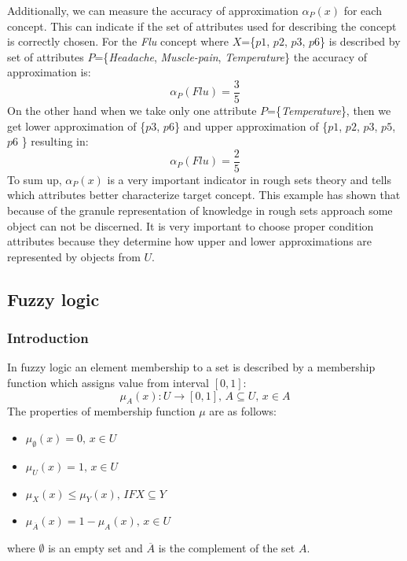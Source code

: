Additionally, we can measure the accuracy of approximation $\alpha_P(x)$ for each concept.
This can indicate if the set of attributes used for describing the concept is correctly
chosen. For the \textit{Flu} concept where $X$=\{$p1$, $p2$, $p3$, $p6$\} is described by
set of attributes $P$=\{\textit{Headache}, \textit{Muscle-pain},
\textit{Temperature}\} the accuracy of approximation is:
$$\alpha_P(Flu) = \frac{3}{5}$$
On the other hand when we take only one attribute $P$=\{\textit{Temperature}\}, then we get lower approximation of 
\{$p3$, $p6$\} and upper approximation of \{$p1$, $p2$, $p3$, $p5$, $p6$ \}
resulting in:
$$\alpha_P(Flu) = \frac{2}{5}$$
To sum up, $\alpha_P(x)$ is a very important indicator in
rough sets theory and tells which attributes better characterize target
concept. This example has shown that because of the granule representation of
knowledge in rough sets approach some object can not be discerned. It is very
important to choose proper condition attributes because they determine how
upper and lower approximations are represented by objects from $U$. 


\subsection{Fuzzy logic}
\label{cha:Fuzzy_logic}
\subsubsection{Introduction}
In fuzzy logic an element membership to a set is described by a membership function 
which assigns value from interval $[0, 1]$:
\begin{equation}
    \mu_A(x):U\rightarrow [0,1], \, A \subseteq U, \, x \in A
    \label{eq:fuzzy_function}
\end{equation}
The properties of membership function $\mu$ are as follows:
\begin{itemize}
    \item $\mu_{\emptyset}(x) = 0, \, x \in U$
    \item  $\mu_{U}(x) = 1, \, x \in U$
    \item  $\mu_{X}(x) \leq \mu_{Y}(x), \, IF X \subseteq Y$
    \item  $\mu_{\overline{A}}(x) = 1 - \mu_{A}(x), \, x \in U$
\end{itemize}
where $\emptyset$ is an empty set and $\overline{A}$ is the complement of the
set $A$.

